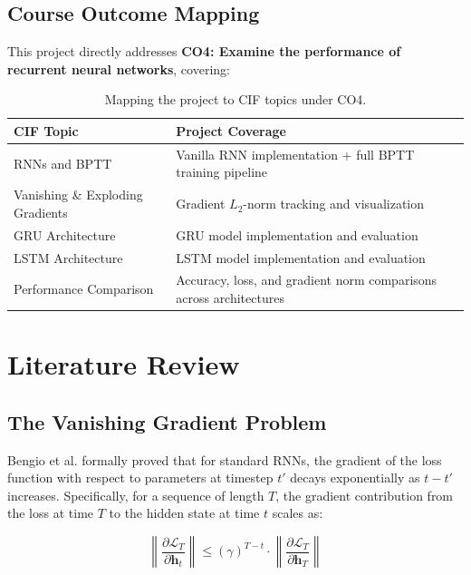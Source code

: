 \documentclass[12pt, a4paper]{article}
\begin{document}
\subsection{Course Outcome Mapping}

This project directly addresses \textbf{CO4: Examine the performance of recurrent neural networks}, covering:

\begin{table}[H]
    \centering
    \caption{Mapping the project to CIF topics under CO4.}
    \label{tab:co4mapping}
    \begin{tabularx}{\textwidth}{lX}
        \toprule
        \textbf{CIF Topic} & \textbf{Project Coverage} \\
        \midrule
        RNNs and BPTT & Vanilla RNN implementation + full BPTT training pipeline \\
        Vanishing \& Exploding Gradients & Gradient $L_2$-norm tracking and visualization \\
        GRU Architecture & GRU model implementation and evaluation \\
        LSTM Architecture & LSTM model implementation and evaluation \\
        Performance Comparison & Accuracy, loss, and gradient norm comparisons across architectures \\
        \bottomrule
    \end{tabularx}
\end{table}

\section{Literature Review}

\subsection{The Vanishing Gradient Problem}

Bengio et al. \cite{bengio1994} formally proved that for standard RNNs, the gradient of the loss function with respect to parameters at timestep $t'$ decays exponentially as $t - t'$ increases. Specifically, for a sequence of length $T$, the gradient contribution from the loss at time $T$ to the hidden state at time $t$ scales as:

\begin{equation}
    \left\| \frac{\partial \mathcal{L}_T}{\partial \mathbf{h}_t} \right\| \leq \left( \gamma \right)^{T-t} \cdot \left\| \frac{\partial \mathcal{L}_T}{\partial \mathbf{h}_T} \right\|
    \label{eq:vanishing}
\end{equation}
\end{document}
